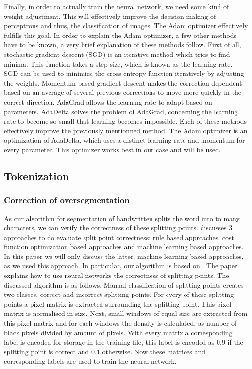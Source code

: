 \documentclass{article}
\begin{document}
Finally, in order to actually train the neural network, we need some kind of weight adjustment. This will effectively improve the decision making of perceptrons and thus, the classification of images. The Adam optimizer effectively fulfills this goal. In order to explain the Adam optimizer, a few other methods have to be known, a very brief explanation of these methods follow. First of all, stochastic gradient descent (SGD) is an iterative method which tries to find minima. This function takes a step size, which is known as the learning rate. SGD can be used to minimize the cross-entropy function iteratively by adjusting the weights. Momentum-based gradient descent makes the correction dependent based on an average of several previous corrections to move more quickly in the correct direction. AdaGrad allows the learning rate to adapt based on parameters. AdaDelta solves the problem of AdaGrad, concerning the learning rate to become so small that learning becomes impossible. Each of these methods effectively improve the previously mentionned method. The Adam optimizer is an optimization of AdaDelta, which uses a distinct learning rate and momentum for every parameter. This optimizer works best in our case and will be used. 

\subsection{Tokenization}
\subsubsection{Correction of oversegmentation}
As our algorithm for segmentation of handwritten splits the word into to many characters, we can verify the correctness of these splitting points. \cite{evalsplitpoints} discusses 3 approaches to do evaluate split point correctness: rule based approaches, cost function optimization based approaches and machine learning based approaches. In this paper we will only discuss the latter, machine learning based approaches, as we used this approach. In particular, our algorithm is based on \cite{evalsplitpointsnn}. The paper explains how to use neural networks the correctness of splitting points. The discussed algorithm is as follows. Manual classification of splitting points creates two classes, correct and incorrect splitting points. For every of these splitting points a pixel matrix is extracted surrounding the splitting point. This pixel matrix is normalised in size. Next, small windows of equal size are extracted from this pixel matrix and for each windows the density is calculated, as number of black pixels divided by amount of pixels. With every matrix a corresponding label is encoded for storage in the training file, this label is encoded as 0.9 if the splitting point is correct and 0.1 otherwise. Now these matrices and corresponding labels are used to train the neural network. 
\end{document}

